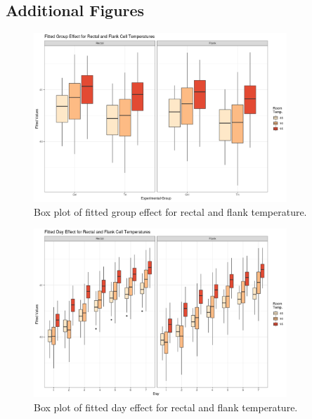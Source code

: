 \documentclass[a4paper, 10pt, titlepage]{article}
\begin{document}
\clearpage

\subsection{Additional Figures}

\begin{figure}[!htbp]
	\centering
		\includegraphics[width = 0.85\textwidth]{images/grp_fit_plot.png}
	\caption{Box plot of fitted group effect for rectal and flank temperature.}
\end{figure}

\begin{figure}[!htbp]
	\centering
		\includegraphics[width = 0.85\textwidth]{images/day_effect_plot.png}
	\caption{Box plot of fitted day effect for rectal and flank temperature.}
\end{figure}
\end{document}
